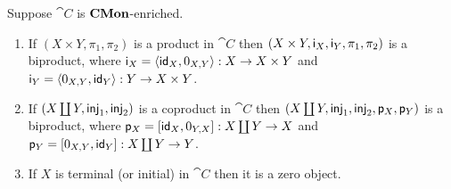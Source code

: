 \begin{proposition}
\label{prop:biproducts:from-product-or-coproduct}
Suppose $\cat{C}$ is $\mathbf{CMon}$-enriched.
\begin{enumerate}
\item If $(X \times Y, \pi_1, \pi_2)$ is a product in $\cat{C}$ then $(X \times Y, \mathsf{i}_X, \mathsf{i}_Y, \pi_1, \pi_2)$
is a biproduct, where $\mathsf{i}_X = \langle \mathsf{id}_X, 0_{X,Y}\rangle: X \to X \times Y$ and $\mathsf{i}_Y =
\langle 0_{X,Y}, \mathsf{id}_Y\rangle: Y \to X \times Y$.
\item If $(X \coprod Y, \mathsf{inj}_1, \mathsf{inj}_2)$ is a coproduct in $\cat{C}$ then $(X \coprod Y, \mathsf{inj}_1, \mathsf{inj}_2,
\mathsf{p}_X, \mathsf{p}_Y)$ is a biproduct, where $\mathsf{p}_X = [\mathsf{id}_X, 0_{Y,X}]: X \coprod Y \to X$ and
$\mathsf{p}_Y = [0_{X,Y}, \mathsf{id}_Y]: X \coprod Y \to Y$.
\item If $X$ is terminal (or initial) in $\cat{C}$ then it is a zero object.
\end{enumerate}
\end{proposition}
